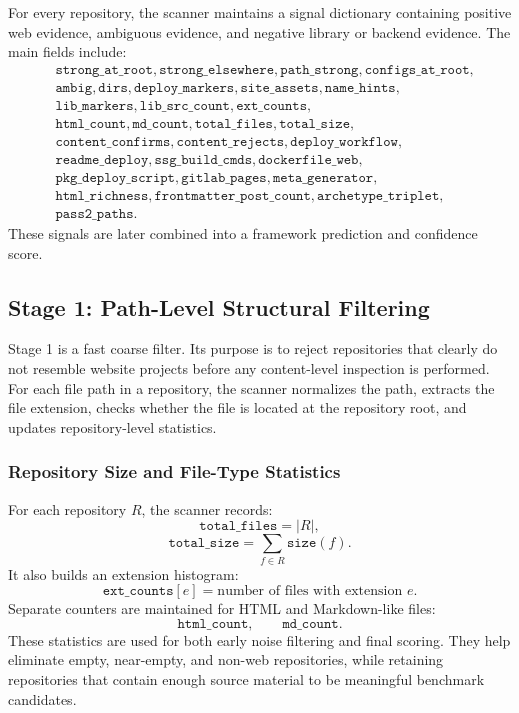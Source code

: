 For every repository, the scanner maintains a signal dictionary containing positive web evidence, ambiguous evidence, and negative library or backend evidence. The main fields include:
\[
\begin{aligned}
&\texttt{strong\_at\_root}, \texttt{strong\_elsewhere}, \texttt{path\_strong}, \texttt{configs\_at\_root},\\
&\texttt{ambig}, \texttt{dirs}, \texttt{deploy\_markers}, \texttt{site\_assets}, \texttt{name\_hints},\\
&\texttt{lib\_markers}, \texttt{lib\_src\_count}, \texttt{ext\_counts},\\
&\texttt{html\_count}, \texttt{md\_count}, \texttt{total\_files}, \texttt{total\_size},\\
&\texttt{content\_confirms}, \texttt{content\_rejects}, \texttt{deploy\_workflow},\\
&\texttt{readme\_deploy}, \texttt{ssg\_build\_cmds}, \texttt{dockerfile\_web},\\
&\texttt{pkg\_deploy\_script}, \texttt{gitlab\_pages}, \texttt{meta\_generator},\\
&\texttt{html\_richness}, \texttt{frontmatter\_post\_count}, \texttt{archetype\_triplet},\\
&\texttt{pass2\_paths}.
\end{aligned}
\]
These signals are later combined into a framework prediction and confidence score.

\subsection{Stage 1: Path-Level Structural Filtering}

Stage 1 is a fast coarse filter. Its purpose is to reject repositories that clearly do not resemble website projects before any content-level inspection is performed. For each file path in a repository, the scanner normalizes the path, extracts the file extension, checks whether the file is located at the repository root, and updates repository-level statistics.

\subsubsection{Repository Size and File-Type Statistics}

For each repository \(R\), the scanner records:
\[
\texttt{total\_files} = |R|,
\]
\[
\texttt{total\_size} = \sum_{f \in R} \texttt{size}(f).
\]
It also builds an extension histogram:
\[
\texttt{ext\_counts}[e] = \text{number of files with extension } e.
\]
Separate counters are maintained for HTML and Markdown-like files:
\[
\texttt{html\_count}, \qquad \texttt{md\_count}.
\]
These statistics are used for both early noise filtering and final scoring. They help eliminate empty, near-empty, and non-web repositories, while retaining repositories that contain enough source material to be meaningful benchmark candidates.

